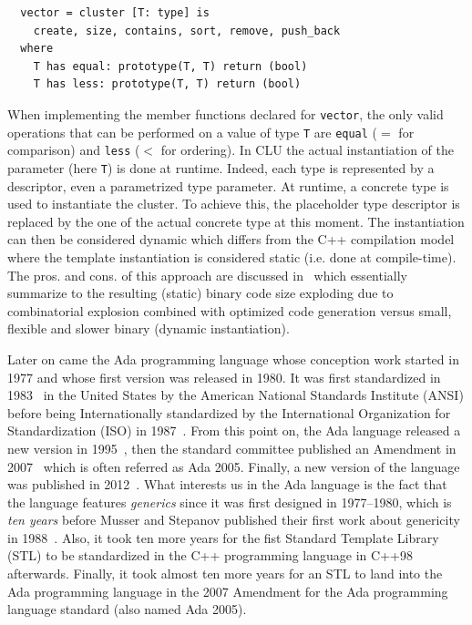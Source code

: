 \begin{verbatim}
  vector = cluster [T: type] is
    create, size, contains, sort, remove, push_back
  where
    T has equal: prototype(T, T) return (bool)
    T has less: prototype(T, T) return (bool)
\end{verbatim}

When implementing the member functions declared for \texttt{vector}, the only valid operations that can be performed on
a value of type \texttt{T} are \texttt{equal} (\(=\) for comparison) and \texttt{less} (\(<\) for ordering). In CLU the
actual instantiation of the parameter (here \texttt{T}) is done at runtime. Indeed, each type is represented by a
descriptor, even a parametrized type parameter. At runtime, a concrete type is used to instantiate the cluster. To
achieve this, the placeholder type descriptor is replaced by the one of the actual concrete type at this moment. The
instantiation can then be considered dynamic which differs from the C++ compilation model where the template
instantiation is considered static (i.e. done at compile-time). The pros. and cons. of this approach are discussed
in~\parencite{atkinson.1978.cluimpl} which essentially summarize to the resulting (static) binary code size exploding
due to combinatorial explosion combined with optimized code generation versus small, flexible and slower binary (dynamic
instantiation).

Later on came the Ada programming language whose conception work started in 1977 and whose first version was released in
1980. It was first standardized in 1983~\parencite{ansi.1983.ada} in the United States by the American National
Standards Institute (ANSI) before being Internationally standardized by the International Organization for
Standardization (ISO) in 1987~\parencite{iso.1987.ada}. From this point on, the Ada language released a new version in
1995~\parencite{iso.1995.ada,iso.1995.ada.corr}, then the standard committee published an Amendment in
2007~\parencite{iso.1995.ada.amend} which is often referred as Ada 2005. Finally, a new version of the language was
published in 2012~\parencite{iso.2012.ada,iso.2012.ada.corr}. What interests us in the Ada language is the fact that the
language features \emph{generics} since it was first designed in 1977--1980, which is \emph{ten years} before Musser and
Stepanov published their first work about genericity in 1988~\parencite{musser.1988.generic}. Also, it took ten more
years for the fist Standard Template Library (STL) to be standardized in the C++ programming language in
C++98~\parencite{iso.1998.cpp} afterwards. Finally, it took almost ten more years for an STL to land into the Ada
programming language in the 2007 Amendment for the Ada programming language standard (also named Ada 2005).

